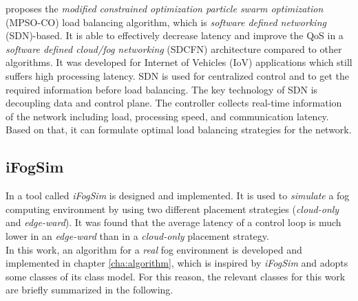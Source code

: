 \cite{novel-load-balancing} proposes the \textit{modified constrained optimization particle swarm optimization} (MPSO-CO) load balancing algorithm, which is \textit{software defined networking} (SDN)-based.
It is able to effectively decrease latency and improve the QoS in a \textit{software defined cloud/fog networking} (SDCFN) architecture compared to other algorithms.
It was developed for Internet of Vehicles (IoV) applications which still suffers high processing latency.
SDN is used for centralized control and to get the required information before load balancing.
The key technology of SDN is decoupling data and control plane.
The controller collects real-time information of the network including load, processing speed, and communication latency.
Based on that, it can formulate optimal load balancing strategies for the network.

\subsection*{iFogSim}

In \cite{ifogsim} a tool called \textit{iFogSim} is designed and implemented.
It is used to \textit{simulate} a fog computing environment by using two different placement strategies (\textit{cloud-only} and \textit{edge-ward}).
It was found that the average latency of a control loop is much lower in an \textit{edge-ward} than in a \textit{cloud-only} placement strategy.\\

In this work, an algorithm for a \textit{real} fog environment is developed and implemented in chapter \ref{cha:algorithm}, which is inspired by \textit{iFogSim} and adopts some classes of its class model. For this reason, the relevant classes for this work are briefly summarized in the following.\\

